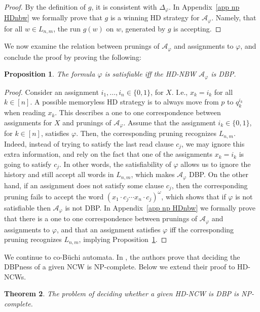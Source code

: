 \documentclass[10pt,a4paper]{amsart}
\newtheorem{thm}{Theorem}[section]
\newtheorem{prop}[thm]{Proposition}
\theoremstyle{definition}
\numberwithin{equation}{section}
\newcommand{\buchi}{B\"uchi\xspace}
\newcommand{\A}{{\mathcal A}}
\begin{document}
\begin{proof}
	By the definition of $g$, it is consistent with $\Delta_\varphi$. In Appendix~\ref{app np HDnbw} we formally prove that $g$ is a winning HD strategy for $\A_\varphi$. Namely, that for all $w\in L_{n,m}$, the run $g(w)$ on $w$, generated by $g$ is accepting.
\end{proof}

We now examine the relation between prunings of $\A_\varphi$ and assignments to $\varphi$, and conclude the proof by proving the following:

\begin{prop}\label{dbp iff sat}
		The formula $\varphi$ is satisfiable iff the HD-NBW $\A_\varphi$ is DBP.
\end{prop}

\begin{proof}
Consider an assignment $i_1,\ldots,i_n\in \{0,1\}$, for $X$. I.e., $x_k=i_k$ for all $k\in[n]$. A possible memoryless HD strategy is to always move from $p$ to $q^{i_k}_k$ when reading $x_k$. This describes a one to one correspondence between assignments for $X$ and prunings of $\A_\varphi$. Assume that the assignment $i_k\in \{0,1\}$, for $k\in [n]$, satisfies $\varphi$. Then, the corresponding pruning recognizes $L_{n,m}$. Indeed, instead of trying to satisfy the last read clause $c_j$, we may ignore this extra information, and rely on the fact that one of the assignments $x_k=i_k$ is going to satisfy $c_j$. In other words, the satisfiability of $\varphi$ allows us to ignore the history and still accept all words in $L_{n,m}$, which makes $\A_\varphi$ DBP. On the other hand, if an assignment does not satisfy some clause $c_j$, then the corresponding pruning fails to accept the word $(x_1\cdot c_j\cdots x_n\cdot c_j)^\omega$, which shows that if $\varphi$ is not satisfiable then $\A_\varphi$ is not DBP. In Appendix~\ref{app np HDnbw} we formally prove that there is a one to one correspondence between prunings of $\A_\varphi$ and assignments to $\varphi$, and that an assignment satisfies $\varphi$ iff the corresponding pruning recognizes $L_{n,m}$, implying Proposition~\ref{dbp iff sat}.
\end{proof}


We continue to co-\buchi automata. In \cite{KM18}, the authors prove that deciding the DBPness of a given NCW is NP-complete. Below we extend their proof to HD-NCWs.

\begin{thm}\label{NPC coBuchi DBP}
	The problem of deciding whether a given HD-NCW is DBP is NP-complete.
\end{thm}
\end{document}
